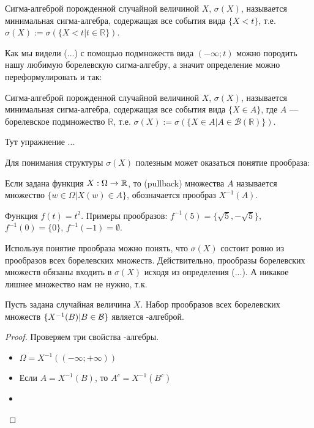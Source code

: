 {\begin{mydef}
Сигма-алгеброй порожденной случайной величиной $ X $, $ \sigma(X) $, называется минимальная сигма-алгебра, содержащая все события вида $ \{X<t\} $, т.е. $ \sigma(X):=\sigma(\{X<t|t\in \mathbb{R}\}) $.
\end{mydef}

Как мы видели (...) с помощью подмножеств вида $ (-\infty;t) $ можно породить нашу любимую борелевскую сигма-алгебру, а значит определение можно переформулировать и так:

\begin{mydef}
Сигма-алгеброй порожденной случайной величиной $ X $, $ \sigma(X) $, называется минимальная сигма-алгебра, содержащая все события вида $ \{X\in A\} $, где $ A $ --- борелевское подмножество $ \mathbb{R} $, т.е. $ \sigma(X):=\sigma(\{X\in A|A\in \mathcal{B}(\mathbb{R})\}) $.
\end{mydef}

Тут упражнение ...

Для понимания структуры $ \sigma(X) $ полезным может оказаться понятие прообраза:

\begin{mydef} Если задана функция $X:\Omega \rightarrow \mathbb R$, то  (pullback) множества $A$ называется множество $\{w\in\Omega|X(w)\in A\}$, обозначается прообраз $X^{-1}(A)$.
\end{mydef}

\begin{myex} Функция $f(t)=t^{2}$. Примеры прообразов: $f^{-1}(5)=\{\sqrt{5},-\sqrt{5}\}$, $f^{-1}(0)=\{0\}$, $f^{-1}(-1)=\emptyset$.
\end{myex}

Используя понятие прообраза можно понять, что $ \sigma(X) $ состоит ровно из прообразов всех борелевских множеств. Действительно, прообразы борелевских множеств обязаны входить в $ \sigma(X) $ исходя из определения (...). А никакое лишнее множество нам не нужно, т.к.

\begin{myth} Пусть задана случайная величина $X$. Набор прообразов всех борелевских множеств $\{X^{-1}(B)|B\in\mathcal{B}\}$ является \s-алгеброй.
\end{myth}
\begin{proof} Проверяем три свойства \s-алгебры.
\begin{itemize}
\item $ \Omega=X^{-1}((-\infty;+\infty)) $
\item Если $ A=X^{-1}(B) $, то $ A^{c}=X^{-1}(B^{c}) $
\item
\end{itemize}



\end{proof}}
